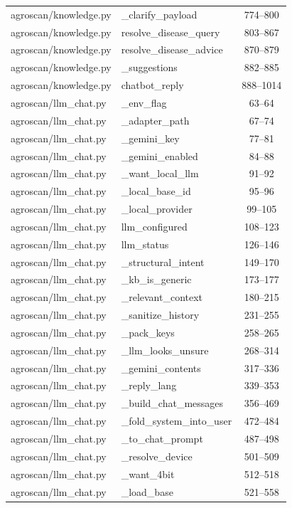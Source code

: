 \begin{center}
\begin{longtable}{@{}p{4.6cm}p{5.2cm}c@{}}
agroscan/knowledge.py & \_clarify\_payload & 774--800 \\
agroscan/knowledge.py & resolve\_disease\_query & 803--867 \\
agroscan/knowledge.py & resolve\_disease\_advice & 870--879 \\
agroscan/knowledge.py & \_suggestions & 882--885 \\
agroscan/knowledge.py & chatbot\_reply & 888--1014 \\
agroscan/llm\_chat.py & \_env\_flag & 63--64 \\
agroscan/llm\_chat.py & \_adapter\_path & 67--74 \\
agroscan/llm\_chat.py & \_gemini\_key & 77--81 \\
agroscan/llm\_chat.py & \_gemini\_enabled & 84--88 \\
agroscan/llm\_chat.py & \_want\_local\_llm & 91--92 \\
agroscan/llm\_chat.py & \_local\_base\_id & 95--96 \\
agroscan/llm\_chat.py & \_local\_provider & 99--105 \\
agroscan/llm\_chat.py & llm\_configured & 108--123 \\
agroscan/llm\_chat.py & llm\_status & 126--146 \\
agroscan/llm\_chat.py & \_structural\_intent & 149--170 \\
agroscan/llm\_chat.py & \_kb\_is\_generic & 173--177 \\
agroscan/llm\_chat.py & \_relevant\_context & 180--215 \\
agroscan/llm\_chat.py & \_sanitize\_history & 231--255 \\
agroscan/llm\_chat.py & \_pack\_keys & 258--265 \\
agroscan/llm\_chat.py & \_llm\_looks\_unsure & 268--314 \\
agroscan/llm\_chat.py & \_gemini\_contents & 317--336 \\
agroscan/llm\_chat.py & \_reply\_lang & 339--353 \\
agroscan/llm\_chat.py & \_build\_chat\_messages & 356--469 \\
agroscan/llm\_chat.py & \_fold\_system\_into\_user & 472--484 \\
agroscan/llm\_chat.py & \_to\_chat\_prompt & 487--498 \\
agroscan/llm\_chat.py & \_resolve\_device & 501--509 \\
agroscan/llm\_chat.py & \_want\_4bit & 512--518 \\
agroscan/llm\_chat.py & \_load\_base & 521--558 \\

\end{longtable}
\end{center}
